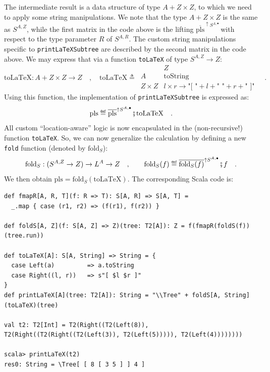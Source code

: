 The intermediate result is a data structure of type $A+Z\times Z$,
to which we need to apply some string manipulations. We note that
the type $A+Z\times Z$ is the same as $S^{A,Z}$, while the first
matrix in the code above is the lifting $\overline{\text{pls}}^{\uparrow S^{A,\bullet}}\,$with
respect to the type parameter $R$ of $S^{A,R}$. The custom string
manipulations specific to \lstinline!printLaTeXSubtree! are described
by the second matrix in the code above. We may express that via a
function \lstinline!toLaTeX! of type $S^{A,Z}\rightarrow Z$:
\[
\text{toLaTeX}:A+Z\times Z\rightarrow Z\quad,\quad\text{toLaTeX}\triangleq\,\begin{array}{|c||c|}
 & Z\\
\hline A & \text{toString}\\
Z\times Z & l\times r\rightarrow\text{"[ "}+l+\text{" "}+r+\text{" ]"}
\end{array}\quad.
\]
Using this function, the implementation of \lstinline!printLaTeXSubtree!
is expressed as:
\[
\text{pls}\triangleq\overline{\text{pls}}^{\uparrow S^{A,\bullet}}\bef\text{toLaTeX}\quad.
\]
All custom \textsf{``}location-aware\textsf{''} logic is now encapsulated in the (non-recursive!)
function \lstinline!toLaTeX!. So, we can now generalize the calculation
by defining a new \lstinline!fold! function (denoted by $\text{fold}_{S}$):
\begin{equation}
\text{fold}_{S}:(S^{A,Z}\rightarrow Z)\rightarrow L^{A}\rightarrow Z\quad,\quad\quad\text{fold}_{S}(f)\triangleq\overline{\text{fold}_{S}(f)}^{\uparrow S^{A,\bullet}}\bef f\quad.\label{eq:fold-via-recursion-scheme-1}
\end{equation}
We then obtain $\text{pls}=\text{fold}_{S}(\text{toLaTeX})$. The
corresponding Scala code is:
\begin{lstlisting}
def fmapR[A, R, T](f: R => T): S[A, R] => S[A, T] =
  _.map { case (r1, r2) => (f(r1), f(r2)) }

def foldS[A, Z](f: S[A, Z] => Z)(tree: T2[A]): Z = f(fmapR(foldS(f))(tree.run))

def toLaTeX[A]: S[A, String] => String = {
  case Left(a)         => a.toString
  case Right((l, r))   => s"[ $l $r ]"
}
def printLaTeX[A](tree: T2[A]): String = "\\Tree" + foldS[A, String](toLaTeX)(tree)

val t2: T2[Int] = T2(Right((T2(Left(8)), T2(Right((T2(Right((T2(Left(3)), T2(Left(5))))), T2(Left(4))))))))

scala> printLaTeX(t2)
res0: String = \Tree[ [ 8 [ 3 5 ] ] 4 ]
\end{lstlisting}

